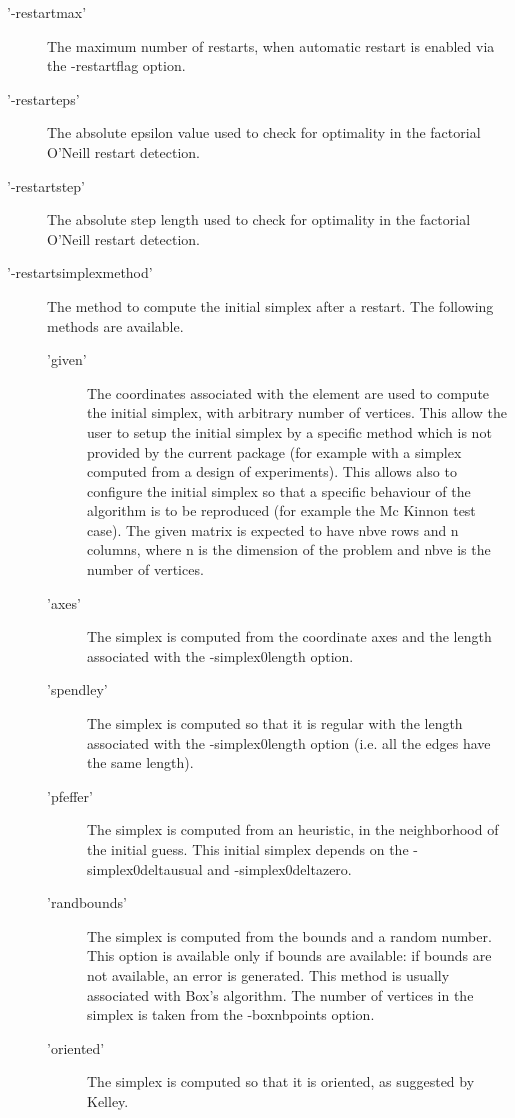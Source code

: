 \begin{Details}
\begin{description}
\begin{description}
\end{description}


\item['-restartmax'] The maximum number of restarts, when automatic restart
is enabled via the -restartflag option.
\item['-restarteps'] The absolute epsilon value used to check for optimality
in the factorial O'Neill restart detection.
\item['-restartstep'] The absolute step length used to check for optimality
in the factorial O'Neill restart detection.
\item['-restartsimplexmethod'] The method to compute the initial simplex
after a restart. The following methods are available.\begin{description}

\item['given'] The coordinates associated with the  element
are used to compute the initial simplex, with arbitrary number of
vertices. This allow the user to setup the initial simplex by a specific
method which is not provided by the current package (for example with
a simplex computed from a design of experiments). This allows also to
configure the initial simplex so that a specific behaviour of the
algorithm is to be reproduced (for example the Mc Kinnon test case).
The given matrix is expected to have nbve rows and n columns, where n
is the dimension of the problem and nbve is the number of vertices.
\item['axes'] The simplex is computed from the coordinate axes and the
length associated with the -simplex0length option.
\item['spendley'] The simplex is computed so that it is regular with the
length associated with the -simplex0length option (i.e. all the edges
have the same length).
\item['pfeffer'] The simplex is computed from an heuristic, in the
neighborhood of the initial guess. This initial simplex depends on the
-simplex0deltausual and -simplex0deltazero.
\item['randbounds'] The simplex is computed from the bounds and a random
number. This option is available only if bounds are available: if
bounds are not available, an error is generated. This method is usually
associated with Box's algorithm. The number of vertices in the simplex
is taken from the -boxnbpoints option.
\item['oriented'] The simplex is computed so that it is oriented, as
suggested by Kelley.


\end{description}
\end{description}
\end{Details}
